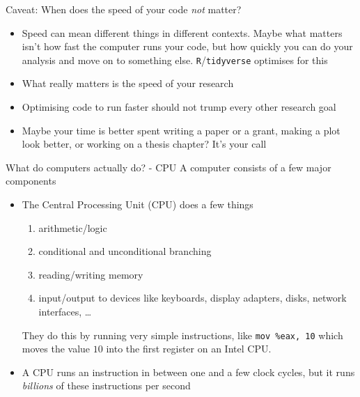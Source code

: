\documentclass{beamer}
\begin{document}
\begin{frame}{Caveat: When does the speed of your code \emph{not} matter?}
	\begin{itemize}
		\item Speed can mean different things in different contexts. Maybe what matters isn't
	how fast the computer runs your code, but how quickly you can do your analysis
	and move on to something else. \texttt{R}/\texttt{tidyverse} optimises for this

\item What really matters is the speed of your research 
	\item Optimising code to run faster should not trump every other research goal
	\item Maybe your time is better spent writing a paper or a grant, making a
plot look better, or working on a thesis chapter? It's your call
\end{itemize}
\end{frame}

\begin{frame}{What do computers actually do? - CPU}
	A computer consists of a few major components
	\begin{itemize}
		\item The Central Processing Unit (CPU) does a few things
			\begin{enumerate}
				\item arithmetic/logic
				\item conditional and unconditional branching
				\item reading/writing memory
				\item input/output to devices like keyboards, display adapters, disks, network interfaces, \ldots
		\end{enumerate}
		They do this by running very simple instructions, like \texttt{mov \%eax, 10} which moves the value $10$ into the first register on an Intel CPU.
	\item A CPU runs an instruction in between one and a few clock cycles, but it runs \emph{billions} of these instructions per second
\end{itemize}
\end{frame}
\end{document}
